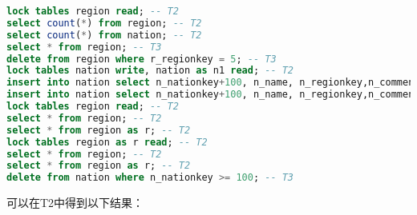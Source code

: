 \documentclass{article}
\begin{document}
\begin{lstlisting}[language=sql]
lock tables region read; -- T2
select count(*) from region; -- T2
select count(*) from nation; -- T2
select * from region; -- T3
delete from region where r_regionkey = 5; -- T3
lock tables nation write, nation as n1 read; -- T2
insert into nation select n_nationkey+100, n_name, n_regionkey,n_comment from nation; -- T2;
insert into nation select n_nationkey+100, n_name, n_regionkey,n_comment from nation as n1; -- T2;
lock tables region read; -- T2
select * from region; -- T2
select * from region as r; -- T2
lock tables region as r read; -- T2
select * from region; -- T2
select * from region as r; -- T2
delete from nation where n_nationkey >= 100; -- T3
\end{lstlisting}

可以在T2中得到以下结果：
\end{document}
